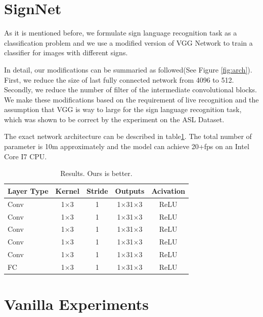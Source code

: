 \documentclass[10pt,twocolumn,letterpaper]{article}
\begin{document}
\blindtext

\blindtext


\section{SignNet}

As it is mentioned before, we formulate sign language recognition task as a classification problem and we use a modified version of VGG Network \cite{simonyan2014very} to train a classifier for images with different signs. 

In detail, our modifications can be summaried as followed(See Figure \ref{fig:arch}). First, we reduce the size of last fully connected network from 4096 to 512. Secondly, we reduce the number of filter of the intermediate convolutional blocks. We make these modifications based on the requirement of live recognition and the assumption that VGG is way to large for the sign language recognition task, which was shown to be correct by the experiment on the ASL Dataset.

The exact network architecture can be described in table\ref{table:arch}. The total number of parameter is 10m approximately and the model can achieve 20+fps on an Intel Core I7 CPU.  

\begin{table}[h]
\begin{center}
\begin{tabular}{|l|c|c|c|c|}
\hline
Layer Type & Kernel & Stride & Outputs & Acivation \\
\hline\hline
Conv & 1$\times$3 & 1 & 1$\times$31$\times$3 & ReLU\\
Conv & 1$\times$3 & 1 & 1$\times$31$\times$3 & ReLU\\
Conv & 1$\times$3 & 1 & 1$\times$31$\times$3 & ReLU\\
Conv & 1$\times$3 & 1 & 1$\times$31$\times$3 & ReLU\\
Conv & 1$\times$3 & 1 & 1$\times$31$\times$3 & ReLU\\
FC & 1$\times$3 & 1 & 1$\times$31$\times$3 & ReLU\\
\hline
\end{tabular}
\end{center}
\caption{Results.  Ours is better.}
\label{table:arch}
\end{table}



\section{Vanilla Experiments}
\end{document}
